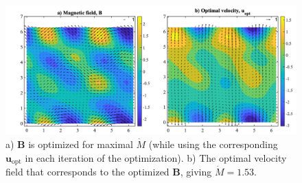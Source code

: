 \documentclass[onecolumn,showpacs,preprintnumbers,amsmath,amssymb]{revtex4-2}
\newcommand{\bvec}[1]{{\mathbf{#1}}}
\newcommand{\uu}{\bvec{u}}
\newcommand{\uopt}{\uu_{\text{opt}}}
\newcommand{\Bvec}{\bvec{B}}
\begin{document}
\begin{figure}[htb]
\centering
 \includegraphics[width=.99 \linewidth]{vfields_opt_K=2.png}
 \caption{
a) $\Bvec$ is optimized for maximal $\dot{M}$ (while using the corresponding $\uopt$ in each iteration of the optimization).
b) The optimal velocity field that corresponds to the optimized $\Bvec$, giving $\dot{M} = 1.53$.}
\label{vfields_opt_K=2}
\end{figure}





\end{document}
